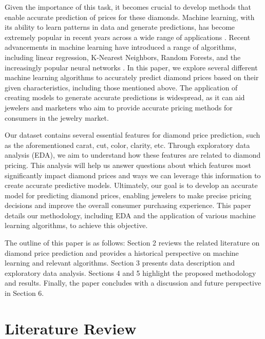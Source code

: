 \documentclass[conference]{IEEEtran}
\begin{document}
Given the importance of this task, it becomes crucial to develop methods that enable accurate prediction of prices for these diamonds. Machine learning, with its ability to learn patterns in data and generate predictions, has become extremely popular in recent years across a wide range of applications \cite{kino}. Recent advancements in machine learning have introduced a range of algorithms, including linear regression, K-Nearest Neighbors, Random Forests, and the increasingly popular neural networks \cite{sarker}. In this paper, we explore several different machine learning algorithms to accurately predict diamond prices based on their given characteristics, including those mentioned above. The application of creating models to generate accurate predictions is widespread, as it can aid jewelers and marketers who aim to provide accurate pricing methods for consumers in the jewelry market.

Our dataset contains several essential features for diamond price prediction, such as the aforementioned carat, cut, color, clarity, etc. \cite{kaggle} Through exploratory data analysis (EDA), we aim to understand how these features are related to diamond pricing. This analysis will help us answer questions about which features most significantly impact diamond prices and ways we can leverage this information to create accurate predictive models. Ultimately, our goal is to develop an accurate model for predicting diamond prices, enabling jewelers to make precise pricing decisions and improve the overall consumer purchasing experience. This paper details our methodology, including EDA and the application of various machine learning algorithms, to achieve this objective.

The outline of this paper is as follows: Section 2 reviews the related literature on diamond price prediction and provides a historical perspective on machine learning and relevant algorithms. Section 3 presents data description and exploratory data analysis. Sections 4 and 5 highlight the proposed methodology and results. Finally, the paper concludes with a discussion and future perspective in Section 6.

\section{Literature Review}
\end{document}
